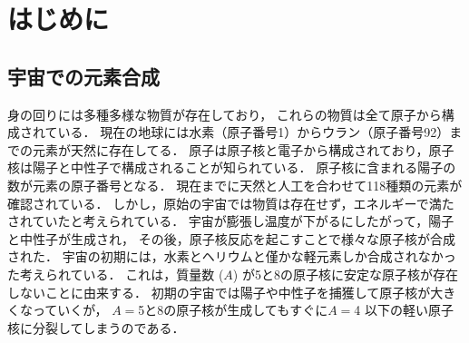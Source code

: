 \documentclass[../master]{subfiles}
\begin{document}
\chapter{はじめに}
\section{宇宙での元素合成}
\label{seq::nucleaosynthesis}
身の回りには多種多様な物質が存在しており，
これらの物質は全て原子から構成されている．
現在の地球には水素（原子番号1）からウラン（原子番号92）までの元素が天然に存在してる．
原子は原子核と電子から構成されており，原子核は陽子と中性子で構成されることが知られている．
原子核に含まれる陽子の数が元素の原子番号となる．
現在までに天然と人工を合わせて118種類の元素が確認されている．
しかし，原始の宇宙では物質は存在せず，エネルギーで満たされていたと考えられている．
宇宙が膨張し温度が下がるにしたがって，陽子と中性子が生成され，
その後，原子核反応を起こすことで様々な原子核が合成された．
宇宙の初期には，水素とヘリウムと僅かな軽元素しか合成されなかった考えられている．
これは，質量数 ($A$) が5と8の原子核に安定な原子核が存在しないことに由来する．
初期の宇宙では陽子や中性子を捕獲して原子核が大きくなっていくが，
$A = $5と8の原子核が生成してもすぐに$A = $4 以下の軽い原子核に分裂してしまうのである．
\end{document}
